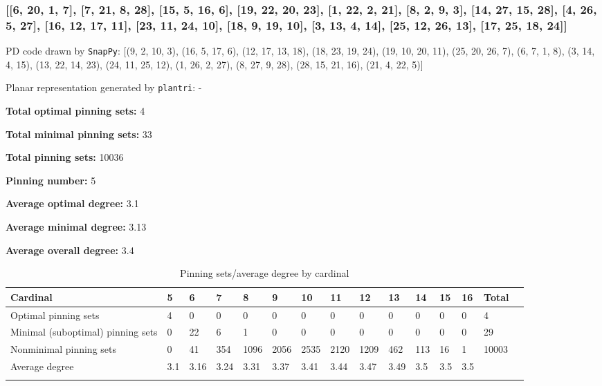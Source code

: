 \documentclass{article}%
\begin{document}
\newpage

\subsubsection{[[6, 20, 1, 7], [7, 21, 8, 28], [15, 5, 16, 6], [19, 22, 20, 23], [1, 22, 2, 21], [8, 2, 9, 3], [14, 27, 15, 28], [4, 26, 5, 27], [16, 12, 17, 11], [23, 11, 24, 10], [18, 9, 19, 10], [3, 13, 4, 14], [25, 12, 26, 13], [17, 25, 18, 24]]}

{\small\noindent PD code drawn by \texttt{SnapPy}: [(9, 2, 10, 3), (16, 5, 17, 6), (12, 17, 13, 18), (18, 23, 19, 24), (19, 10, 20, 11), (25, 20, 26, 7), (6, 7, 1, 8), (3, 14, 4, 15), (13, 22, 14, 23), (24, 11, 25, 12), (1, 26, 2, 27), (8, 27, 9, 28), (28, 15, 21, 16), (21, 4, 22, 5)]}

{\small\noindent Planar representation generated by \texttt{plantri}: -}

\begin{multicols}{2}
{\normalsize \noindent\textbf{Total optimal pinning sets:} 4

\noindent\textbf{Total minimal pinning sets:} 33

\noindent\textbf{Total pinning sets:} 10036

\noindent\textbf{Pinning number:} 5

}
\columnbreak

{\normalsize \noindent\textbf{Average optimal degree:} 3.1

\noindent\textbf{Average minimal degree:} 3.13

\noindent\textbf{Average overall degree:} 3.4

}
\end{multicols}

\begin{table}[ht]
	\caption{Pinning sets/average degree by cardinal}
	\centering
	\renewcommand{\arraystretch}{1.5}
	\begin{tabularx}{\textwidth}{lXXXXXXXXXXXXXX}
		\toprule
			Cardinal & 5 & 6 & 7 & 8 & 9 & 10 & 11 & 12 & 13 & 14 & 15 & 16 & Total\\
			\hline
			Optimal pinning sets & 4 & 0 & 0 & 0 & 0 & 0 & 0 & 0 & 0 & 0 & 0 & 0 & 4 \\
			Minimal (suboptimal) pinning sets & 0 & 22 & 6 & 1 & 0 & 0 & 0 & 0 & 0 & 0 & 0 & 0 & 29 \\
			Nonminimal pinning sets & 0 & 41 & 354 & 1096 & 2056 & 2535 & 2120 & 1209 & 462 & 113 & 16 & 1 & 10003 \\
			Average degree & 3.1 & 3.16 & 3.24 & 3.31 & 3.37 & 3.41 & 3.44 & 3.47 & 3.49 & 3.5 & 3.5 & 3.5 &  \\
		\bottomrule \\ 
	\end{tabularx}
\end{table}
\end{document}
